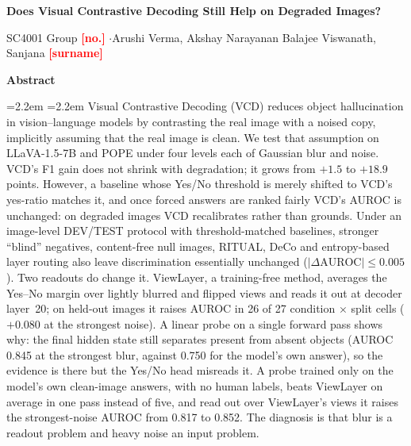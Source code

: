 \documentclass[10pt,a4paper]{article}
\newcommand{\todo}[1]{\textcolor{red}{\textbf{[#1]}}}       %
\newcommand{\ours}{ViewLayer}
\begin{document}
{\small\tableofcontents}
\thispagestyle{empty}
\clearpage
{}

\begin{center}
{\fontsize{13.5}{16}\selectfont\bfseries Does Visual Contrastive Decoding Still Help on Degraded Images?\par}
\vspace{4pt}
{\small\color{ink2} SC4001 Group \todo{no.} \quad$\cdot$\quad Arushi Verma, Akshay Narayanan Balajee Viswanath, Sanjana \todo{surname}\par}
\end{center}
\vspace{2pt}

\begin{center}\textbf{Abstract}\end{center}
\vspace{-6pt}
{\leftskip=2.2em \rightskip=2.2em \small\noindent
Visual Contrastive Decoding (VCD) reduces object hallucination in vision--language models by contrasting the real image with a noised copy, implicitly assuming that the real image is clean. We test that assumption on LLaVA-1.5-7B and POPE under four levels each of Gaussian blur and noise. VCD's F1 gain does not shrink with degradation; it grows from $+1.5$ to $+18.9$ points. However, a baseline whose Yes/No threshold is merely shifted to VCD's yes-ratio matches it, and once forced answers are ranked fairly VCD's AUROC is unchanged: on degraded images VCD recalibrates rather than grounds. Under an image-level DEV/TEST protocol with threshold-matched baselines, stronger ``blind'' negatives, content-free null images, RITUAL, DeCo and entropy-based layer routing also leave discrimination essentially unchanged ($|\Delta\text{AUROC}|\le0.005$). Two readouts do change it. \ours{}, a training-free method, averages the Yes--No margin over lightly blurred and flipped views and reads it out at decoder layer~20; on held-out images it raises AUROC in 26 of 27 condition $\times$ split cells ($+0.080$ at the strongest noise). A linear probe on a single forward pass shows why: the final hidden state still separates present from absent objects (AUROC 0.845 at the strongest blur, against 0.750 for the model's own answer), so the evidence is there but the Yes/No head misreads it. A probe trained only on the model's own clean-image answers, with no human labels, beats \ours{} on average in one pass instead of five, and read out over \ours{}'s views it raises the strongest-noise AUROC from 0.817 to 0.852. The diagnosis is that blur is a readout problem and heavy noise an input problem.\par}
\vspace{4pt}
\end{document}

